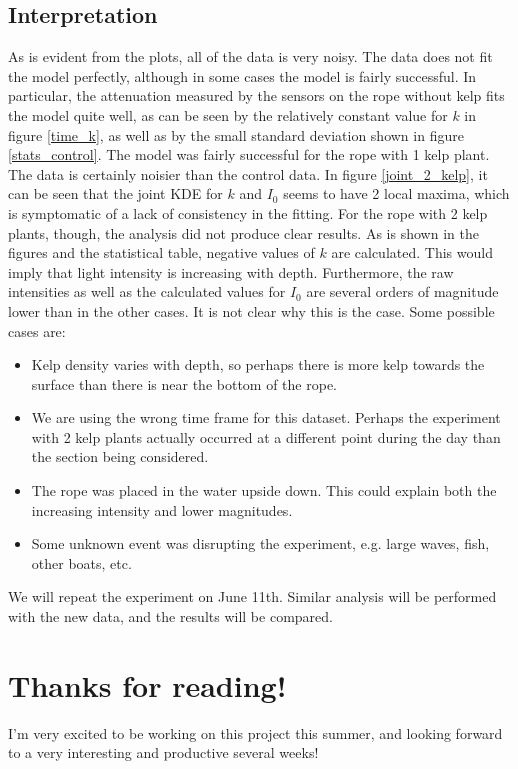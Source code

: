 \documentclass{article}
\begin{document}
\subsection{Interpretation}
As is evident from the plots, all of the data is very noisy. The data does not fit the model perfectly, although in some cases the model is fairly successful. In particular, the attenuation measured by the sensors on the rope without kelp fits the model quite well, as can be seen by the relatively constant value for $k$ in figure \ref{time_k}, as well as by the small standard deviation shown in figure \ref{stats_control}. The model was fairly successful for the rope with 1 kelp plant. The data is certainly noisier than the control data. In figure \ref{joint_2_kelp}, it can be seen that the joint KDE for $k$ and $I_0$ seems to have 2 local maxima, which is symptomatic of a lack of consistency in the fitting. For the rope with 2 kelp plants, though, the analysis did not produce clear results. As is shown in the figures and the statistical table, negative values of $k$ are calculated. This would imply that light intensity is increasing with depth. Furthermore, the raw intensities as well as the calculated values for $I_0$ are several orders of magnitude lower than in the other cases. It is not clear why this is the case. Some possible cases are:
\begin{itemize}
	\item Kelp density varies with depth, so perhaps there is more kelp towards the surface than there is near the bottom of the rope.
	\item We are using the wrong time frame for this dataset. Perhaps the experiment with 2 kelp plants actually occurred at a different point during the day than the section being considered.
	\item The rope was placed in the water upside down. This could explain both the increasing intensity and lower magnitudes.
	\item Some unknown event was disrupting the experiment, e.g. large waves, fish, other boats, etc.
\end{itemize}

We will repeat the experiment on June 11th. Similar analysis will be performed with the new data, and the results will be compared.

\section{Thanks for reading!}
I'm very excited to be working on this project this summer, and looking forward to a very interesting and productive several weeks!
\end{document}
